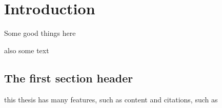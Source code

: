 \chapter{Introduction}

Some good things here

also some text

\section{The first section header}

this thesis has many features, such as content and citations, such as \cite{wallis_game_on_2020}